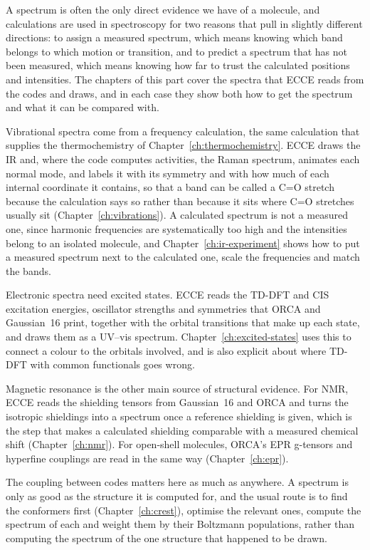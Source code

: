 
A spectrum is often the only direct evidence we have of a molecule, and calculations are used in spectroscopy for two reasons that pull in slightly different directions: to assign a measured spectrum, which means knowing which band belongs to which motion or transition, and to predict a spectrum that has not been measured, which means knowing how far to trust the calculated positions and intensities. The chapters of this part cover the spectra that ECCE reads from the codes and draws, and in each case they show both how to get the spectrum and what it can be compared with.

Vibrational spectra come from a frequency calculation, the same calculation that supplies the thermochemistry of Chapter~\ref{ch:thermochemistry}. ECCE draws the IR and, where the code computes activities, the Raman spectrum, animates each normal mode, and labels it with its symmetry and with how much of each internal coordinate it contains, so that a band can be called a C=O stretch because the calculation says so rather than because it sits where C=O stretches usually sit (Chapter~\ref{ch:vibrations}). A calculated spectrum is not a measured one, since harmonic frequencies are systematically too high and the intensities belong to an isolated molecule, and Chapter~\ref{ch:ir-experiment} shows how to put a measured spectrum next to the calculated one, scale the frequencies and match the bands.

Electronic spectra need excited states. ECCE reads the TD-DFT and CIS excitation energies, oscillator strengths and symmetries that ORCA and Gaussian~16 print, together with the orbital transitions that make up each state, and draws them as a UV--vis spectrum. Chapter~\ref{ch:excited-states} uses this to connect a colour to the orbitals involved, and is also explicit about where TD-DFT with common functionals goes wrong.

Magnetic resonance is the other main source of structural evidence. For NMR, ECCE reads the shielding tensors from Gaussian~16 and ORCA and turns the isotropic shieldings into a spectrum once a reference shielding is given, which is the step that makes a calculated shielding comparable with a measured chemical shift (Chapter~\ref{ch:nmr}). For open-shell molecules, ORCA's EPR g-tensors and hyperfine couplings are read in the same way (Chapter~\ref{ch:epr}).

The coupling between codes matters here as much as anywhere. A spectrum is only as good as the structure it is computed for, and the usual route is to find the conformers first (Chapter~\ref{ch:crest}), optimise the relevant ones, compute the spectrum of each and weight them by their Boltzmann populations, rather than computing the spectrum of the one structure that happened to be drawn.
